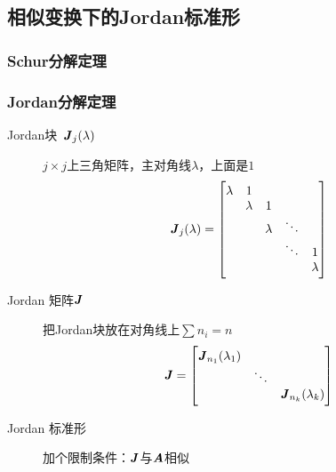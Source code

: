 \subsection{相似变换下的Jordan标准形}
\label{sub:相似变换下的Jordan标准形}

\subsubsection{Schur分解定理}
\label{ssub:schurfen_jie_ding_li_}

\subsubsection{Jordan分解定理}
\label{ssub:jordanfen_jie_ding_li_}

\begin{definition}
    \begin{description}
        \item[Jordan块\, $\boldsymbol{\mathit{J}}_{j}(\lambda)$] $j \times j$上三角矩阵，主对角线$\lambda$，上面是$1$
            $$ \boldsymbol{\mathit{J}}_{j}(\lambda) = \begin{bmatrix}
                \lambda     &   1       &             &              &          \\
                            &   \lambda &   1         &              &          \\
                            &           &   \lambda   &   \ddots     &          \\
                            &           &             &   \ddots     &     1    \\
                            &           &             &              &     \lambda
            \end{bmatrix} $$
        \item[Jordan 矩阵$\boldsymbol{\mathit{J}}$] 把Jordan块放在对角线上$\sum n_i = n$ $$
            \boldsymbol{\mathit{J}} = \begin{bmatrix}
                \boldsymbol{\mathit{J}}_{n_1}(\lambda_1)     &           &           \\
                                        & \ddots    &           \\
                                        &           & \boldsymbol{\mathit{J}}_{n_k}(\lambda_k)
            \end{bmatrix}
            $$
        \item[Jordan 标准形] 加个限制条件：$\boldsymbol{\mathit{J}}$与$\boldsymbol{\mathit{A}}$相似
    \end{description}
\end{definition}

